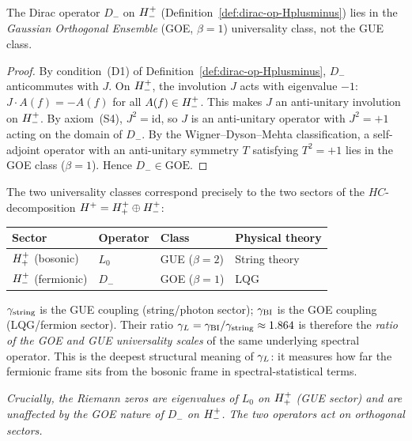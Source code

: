 \begin{proposition}
\label{prop:goe-fermionic}
The Dirac operator $D_{-}$ on $H^+_-$ (Definition~\ref{def:dirac-op-Hplusminus})
lies in the \emph{Gaussian Orthogonal Ensemble} (GOE, $\beta=1$) universality
class, not the GUE class.
\end{proposition}

\begin{proof}
By condition~(D1) of Definition~\ref{def:dirac-op-Hplusminus}, $D_-$
anticommutes with $J$. On $H^+_-$, the involution $J$ acts with
eigenvalue $-1$: $J\cdot A(f) = -A(f)$ for all $A(f)\in H^+_-$.
This makes $J$ an anti-unitary involution on $H^+_-$.
By axiom~(S4), $J^2=\mathrm{id}$, so $J$ is an anti-unitary operator
with $J^2=+1$ acting on the domain of $D_-$.
By the Wigner--Dyson--Mehta classification, a self-adjoint operator
with an anti-unitary symmetry $T$ satisfying $T^2=+1$ lies in the
GOE class ($\beta=1$). Hence $D_-\in\mathrm{GOE}$.
\end{proof}

\begin{remark}
\label{rem:goe-gue-string-lqg}
The two universality classes correspond precisely to the two sectors of
the $HC$-decomposition $H^+ = H^+_+\oplus H^+_-$:
\begin{center}
\renewcommand{\arraystretch}{1.3}
\begin{tabular}{llll}
\toprule
Sector & Operator & Class & Physical theory \\
\midrule
$H^+_+$ (bosonic) & $L_0$ & GUE ($\beta=2$) & String theory \\
$H^+_-$ (fermionic) & $D_-$ & GOE ($\beta=1$) & LQG \\
\bottomrule
\end{tabular}
\end{center}
$\gamma_{\mathrm{string}}$ is the GUE coupling (string/photon sector);
$\gamma_{\mathrm{BI}}$ is the GOE coupling (LQG/fermion sector).
Their ratio $\gamma_L = \gamma_{\mathrm{BI}}/\gamma_{\mathrm{string}} \approx 1.864$ is therefore the
\emph{ratio of the GOE and GUE universality scales} of the same
underlying spectral operator.
This is the deepest structural meaning of $\gamma_L$:
it measures how far the fermionic frame sits from the bosonic frame
in spectral-statistical terms.

\emph{Crucially, the Riemann zeros are eigenvalues of $L_0$ on
$H^+_+$ (GUE sector) and are unaffected by the GOE nature of
$D_-$ on $H^+_-$. The two operators act on orthogonal sectors.}
\end{remark}

